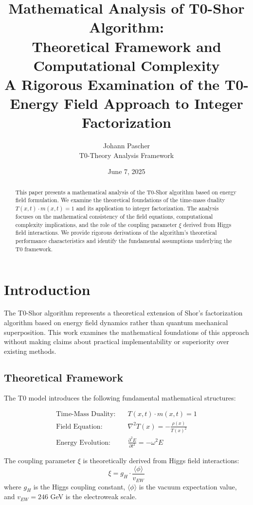 \documentclass[12pt,a4paper]{article}
\title{Mathematical Analysis of T0-Shor Algorithm: \\
	Theoretical Framework and Computational Complexity \\
	\large A Rigorous Examination of the T0-Energy Field Approach to Integer Factorization}
\author{Johann Pascher \\
	T0-Theory Analysis Framework}
\date{June 7, 2025}
\begin{document}
	
	\maketitle
	
	\begin{abstract}
		This paper presents a mathematical analysis of the T0-Shor algorithm based on energy field formulation. We examine the theoretical foundations of the time-mass duality $T(x,t) \cdot m(x,t) = 1$ and its application to integer factorization. The analysis focuses on the mathematical consistency of the field equations, computational complexity implications, and the role of the coupling parameter $\xi$ derived from Higgs field interactions. We provide rigorous derivations of the algorithm's theoretical performance characteristics and identify the fundamental assumptions underlying the T0 framework.
	\end{abstract}
	
	\tableofcontents
	\newpage
	
	\section{Introduction}
	
	The T0-Shor algorithm represents a theoretical extension of Shor's factorization algorithm based on energy field dynamics rather than quantum mechanical superposition. This work examines the mathematical foundations of this approach without making claims about practical implementability or superiority over existing methods.
	
	\subsection{Theoretical Framework}
	
	The T0 model introduces the following fundamental mathematical structures:
	
	\begin{align}
		\text{Time-Mass Duality}: \quad &T(x,t) \cdot m(x,t) = 1 \label{eq:duality}\\
		\text{Field Equation}: \quad &\nabla^2 T(x) = -\frac{\rho(x)}{T(x)^2} \label{eq:field}\\
		\text{Energy Evolution}: \quad &\frac{\partial^2 E}{\partial t^2} = -\omega^2 E \label{eq:evolution}
	\end{align}
	
	The coupling parameter $\xi$ is theoretically derived from Higgs field interactions:
	\begin{equation}
		\xi = g_H \cdot \frac{\langle\phi\rangle}{v_{EW}} \label{eq:xi_higgs}
	\end{equation}
	where $g_H$ is the Higgs coupling constant, $\langle\phi\rangle$ is the vacuum expectation value, and $v_{EW} = 246$ GeV is the electroweak scale.
	
\end{document}
